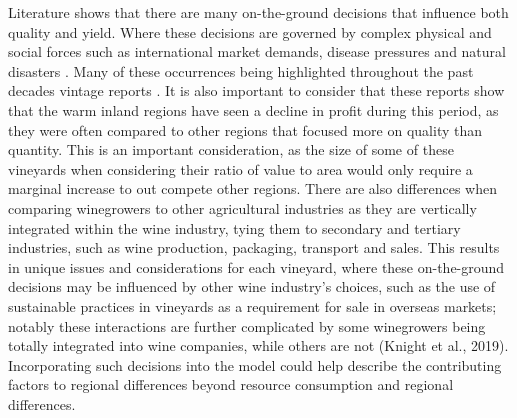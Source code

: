 \documentclass[review,12pt,authoryear]{elsarticle}
\begin{document}
\begin{linenumbers}
Literature shows that there are many on-the-ground decisions that influence both quality and yield. Where these decisions are governed by complex physical and social forces such as international market demands, disease pressures and natural disasters \citep{abadCoverCropsViticulture2021,cortezUsingDataMining2009,hallWithinseasonTemporalVariation2011,i.goodwinManagingSoilWater2009,kasimatiPredictingGrapeSugar2022,oliverReviewSoilPhysical2013,srivastavaNondestructiveSensingMethods2018}. Many of these occurrences being highlighted throughout the past decades vintage reports \citep{wineaustraliaNationalVintageReport2019,wineaustraliaNationalVintageReport2021,wineaustraliaNationalVintageReport2022,winemakersfederationofaustraliaNationalVintageReport2013,winemakersfederationofaustraliaNationalVintageReport2014,winemakersfederationofaustraliaNationalVintageReport2015,winemakersfederationofaustraliaNationalVintageReport2016,winemakersfederationofaustraliaNationalVintageReport2017,winemakersfederationofaustraliaNationalVintageReport2018}. %
It is also important to consider that these reports show that the warm inland regions have seen a decline in profit during this period, as they were often compared to other regions that focused more on quality than quantity. This is an important consideration, as the size of some of these vineyards when considering their ratio of value to area would only require a marginal increase to out compete other regions. There are also differences when comparing winegrowers to other agricultural industries as they are vertically integrated within the wine industry, tying them to secondary and tertiary industries, such as wine production, packaging, transport and sales. This results in unique issues and considerations for each vineyard, where these on-the-ground decisions may be influenced by other wine industry's choices, such as the use of sustainable practices in vineyards as a requirement for sale in overseas markets; notably these interactions are further complicated by some winegrowers being totally integrated into wine companies, while others are not (Knight et al., 2019). Incorporating such decisions into the model could help describe the contributing factors to regional differences beyond resource consumption and regional differences. 


\end{linenumbers}
\end{document}
